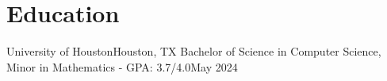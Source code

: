 \section{Education}
\resumeSubHeadingListStart
    \resumeSubheading
    {University of Houston}{Houston, TX}
    {Bachelor of Science in Computer Science, Minor in Mathematics - GPA: 3.7/4.0}{May 2024}
    \resumeItemListStart
    \resumeItemListEnd
\resumeSubHeadingListEnd
